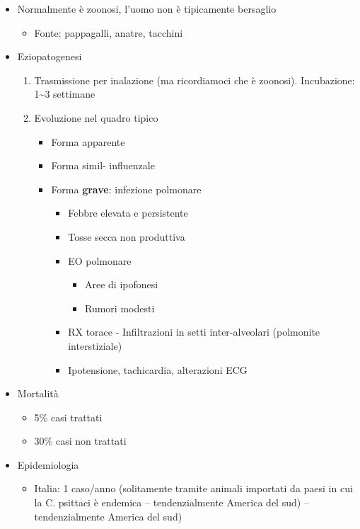 \documentclass[italian,]{article}
\providecommand{\tightlist}{%
  \setlength{\itemsep}{0pt}\setlength{\parskip}{0pt}}
\begin{document}
\begin{itemize}
\tightlist
\item
  Normalmente è zoonosi, l'uomo non è tipicamente bersaglio

  \begin{itemize}
  \tightlist
  \item
    Fonte: pappagalli, anatre, tacchini
  \end{itemize}
\item
  Eziopatogenesi

  \begin{enumerate}
  \def\labelenumi{\arabic{enumi}.}
  \setcounter{enumi}{-1}
  \tightlist
  \item
    Trasmissione per inalazione (ma ricordiamoci che è zoonosi).
    Incubazione: 1\textasciitilde{}3 settimane
  \item
    Evoluzione nel quadro tipico

    \begin{itemize}
    \tightlist
    \item
      Forma apparente
    \item
      Forma simil- influenzale
    \item
      Forma \textbf{grave}: infezione polmonare

      \begin{itemize}
      \tightlist
      \item
        Febbre elevata e persistente
      \item
        Tosse secca non produttiva
      \item
        EO polmonare

        \begin{itemize}
        \tightlist
        \item
          Aree di ipofonesi
        \item
          Rumori modesti
        \end{itemize}
      \item
        RX torace - Infiltrazioni in setti inter-alveolari (polmonite
        interstiziale)
      \item
        Ipotensione, tachicardia, alterazioni ECG
      \end{itemize}
    \end{itemize}
  \end{enumerate}
\item
  Mortalità

  \begin{itemize}
  \tightlist
  \item
    5\% casi trattati
  \item
    30\% casi non trattati
  \end{itemize}
\item
  Epidemiologia

  \begin{itemize}
  \tightlist
  \item
    Italia: 1 caso/anno (solitamente tramite animali importati da paesi
    in cui la C. psittaci è endemica -- tendenzialmente America del sud)
    -- tendenzialmente America del sud)
  \end{itemize}
\end{itemize}
\end{document}
